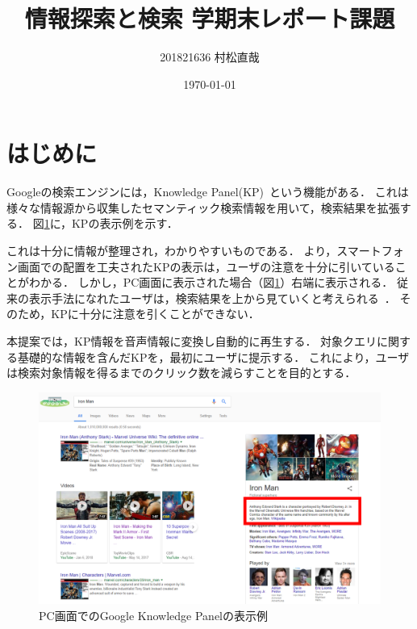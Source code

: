\documentclass[pdflatex,ja=standard]{bxjsarticle}
\title{情報探索と検索 学期末レポート課題}
\author{201821636 村松直哉}
\date{\today}
\begin{document}
\maketitle
%
%



\section{はじめに}
Googleの検索エンジンには，{\rm Knowledge Panel}(KP)~\cite{Amit2012}という機能がある．
これは様々な情報源から収集したセマンティック検索情報を用いて，検索結果を拡張する．
図\ref{fig:knowledgepanel}に，KPの表示例を示す．

これは十分に情報が整理され，わかりやすいものである．
\cite{Lagun}より，スマートフォン画面での配置を工夫されたKPの表示は，ユーザの注意を十分に引いていることがわかる．
しかし，PC画面に表示された場合（図\ref{fig:knowledgepanel}）右端に表示される．
従来の表示手法になれたユーザは，検索結果を上から見ていくと考えられる~\cite{Granka2004}．
そのため，KPに十分に注意を引くことができない．

本提案では，KP情報を音声情報に変換し自動的に再生する．
対象クエリに関する基礎的な情報を含んだKPを，最初にユーザに提示する．
これにより，ユーザは検索対象情報を得るまでのクリック数を減らすことを目的とする．

\begin{figure}[htb]
\begin{center}
    \includegraphics[width=14cm]{figs/ironman.png}
\end{center}
\caption{PC画面でのGoogle Knowledge Panelの表示例}
\label{fig:knowledgepanel}
\end{figure}
\end{document}
